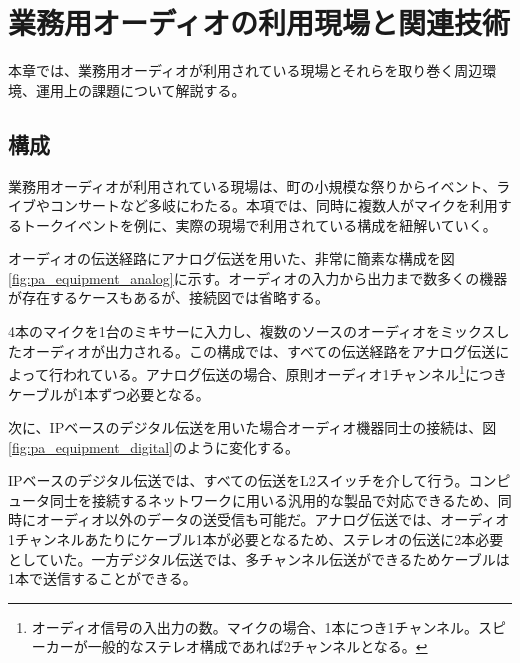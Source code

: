 \chapter{業務用オーディオの利用現場と関連技術}
\label{chap:related_works}

本章では、業務用オーディオが利用されている現場とそれらを取り巻く周辺環境、運用上の課題について解説する。

\section{構成}

業務用オーディオが利用されている現場は、町の小規模な祭りからイベント、ライブやコンサートなど多岐にわたる。本項では、同時に複数人がマイクを利用するトークイベントを例に、実際の現場で利用されている構成を紐解いていく。

オーディオの伝送経路にアナログ伝送を用いた、非常に簡素な構成を図\ref{fig:pa_equipment_analog}に示す。オーディオの入力から出力まで数多くの機器が存在するケースもあるが、接続図では省略する。


4本のマイクを1台のミキサーに入力し、複数のソースのオーディオをミックスしたオーディオが出力される。この構成では、すべての伝送経路をアナログ伝送によって行われている。アナログ伝送の場合、原則オーディオ1チャンネル\footnote{オーディオ信号の入出力の数。マイクの場合、1本につき1チャンネル。スピーカーが一般的なステレオ構成であれば2チャンネルとなる。}につきケーブルが1本ずつ必要となる。

次に、IPベースのデジタル伝送を用いた場合オーディオ機器同士の接続は、図\ref{fig:pa_equipment_digital}のように変化する。


IPベースのデジタル伝送では、すべての伝送をL2スイッチを介して行う。コンピュータ同士を接続するネットワークに用いる汎用的な製品で対応できるため、同時にオーディオ以外のデータの送受信も可能だ。アナログ伝送では、オーディオ1チャンネルあたりにケーブル1本が必要となるため、ステレオの伝送に2本必要としていた。一方デジタル伝送では、多チャンネル伝送ができるためケーブルは1本で送信することができる。

